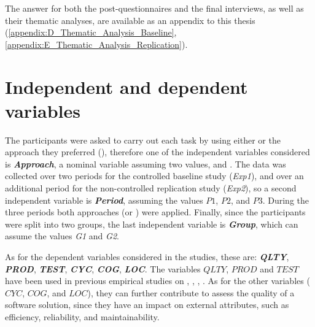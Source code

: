 The answer for both the post-questionnaires and the final interviews, as well as their thematic analyses, are available as an appendix to this thesis (\ref{appendix:D_Thematic_Analysis_Baseline}, \ref{appendix:E_Thematic_Analysis_Replication}).



\section{Independent and dependent variables}
The participants were asked to carry out each task by using either \tdd or the approach they preferred (\notdd), therefore one of the independent variables considered is \textbf{\textit{Approach}}, a nominal variable assuming two values, \tdd and \notdd. The data was collected over two periods for the controlled baseline study (\textit{Exp1}), and over an additional period for the non-controlled replication study (\textit{Exp2}), so a second independent variable is \textbf{\textit{Period}}, assuming the values $P1$, $P2$, and $P3$. During the three periods both approaches (\tdd or \notdd) were applied. Finally, since the participants were split into two groups, the last independent variable is \textbf{\textit{Group}}, which can assume the values \textit{G1} and \textit{G2}.

As for the dependent variables considered in the studies, these are: \textbf{\textit{QLTY}}, \textbf{\textit{PROD}}, \textbf{\textit{TEST}}, \textbf{\textit{CYC}}, \textbf{\textit{COG}}, \textbf{\textit{LOC}}.
The variables $QLTY$, $PROD$ and $TEST$ have been used in previous empirical studies on \noess \cite{DBLP:journals/tse/ErdogmusMT05}, \cite{DBLP:journals/tse/FucciETOJ17}, \cite{DBLP:conf/esem/Fucci0BCSTJ18}, \cite{DBLP:journals/ese/TosunDFVTESOTJJ17}. As for the other variables (\ie $CYC$, $COG$, and $LOC$), they can further contribute to assess the quality of a software solution, since they have an impact on external attributes, such as efficiency, reliability, and maintainability.

